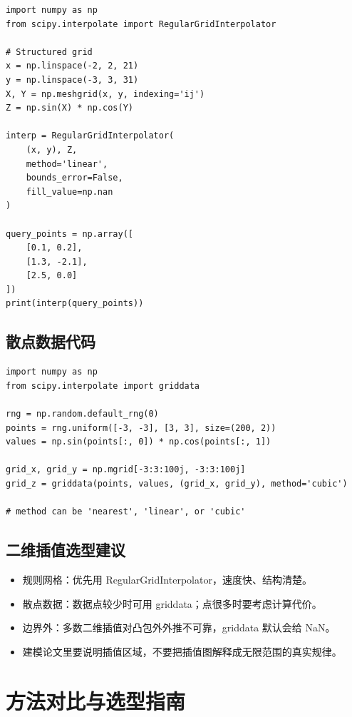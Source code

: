 \documentclass[11pt,a4paper]{ctexart}
\begin{document}
\begin{lstlisting}
import numpy as np
from scipy.interpolate import RegularGridInterpolator

# Structured grid
x = np.linspace(-2, 2, 21)
y = np.linspace(-3, 3, 31)
X, Y = np.meshgrid(x, y, indexing='ij')
Z = np.sin(X) * np.cos(Y)

interp = RegularGridInterpolator(
    (x, y), Z,
    method='linear',
    bounds_error=False,
    fill_value=np.nan
)

query_points = np.array([
    [0.1, 0.2],
    [1.3, -2.1],
    [2.5, 0.0]
])
print(interp(query_points))
\end{lstlisting}

\subsection{散点数据代码}

\begin{lstlisting}
import numpy as np
from scipy.interpolate import griddata

rng = np.random.default_rng(0)
points = rng.uniform([-3, -3], [3, 3], size=(200, 2))
values = np.sin(points[:, 0]) * np.cos(points[:, 1])

grid_x, grid_y = np.mgrid[-3:3:100j, -3:3:100j]
grid_z = griddata(points, values, (grid_x, grid_y), method='cubic')

# method can be 'nearest', 'linear', or 'cubic'
\end{lstlisting}

\subsection{二维插值选型建议}

\begin{itemize}
  \item 规则网格：优先用 RegularGridInterpolator，速度快、结构清楚。
  \item 散点数据：数据点较少时可用 griddata；点很多时要考虑计算代价。
  \item 边界外：多数二维插值对凸包外外推不可靠，griddata 默认会给 NaN。
  \item 建模论文里要说明插值区域，不要把插值图解释成无限范围的真实规律。
\end{itemize}

\newpage
\section{方法对比与选型指南}
\end{document}
